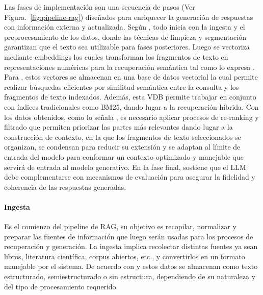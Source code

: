 Las fases de implementación son una secuencia de pasos (Ver Figura.~\ref{fig:pipeline-rag}) diseñados para enriquecer la generación de respuestas con información externa y actualizada. 
Según \textcite{tabassum2020}, todo inicia con la ingesta y el preprocesamiento de los datos, donde las técnicas de limpieza y segmentación garantizan 
que el texto sea utilizable para fases posteriores. Luego se vectoriza mediante embeddings los cuales transforman los fragmentos de texto
en representaciones numéricas para la recuperación semántica tal como lo expresa \textcite{minaee2021}. Para \textcite{hu2024ragrau}, estos vectores se almacenan en una base de datos vectorial 
la cual permite realizar búsquedas eficientes por similitud semántica entre la consulta y los fragmentos de texto indexados.
Además, esta VDB permite trabajar en conjunto con índices tradicionales como BM25, dando lugar a la recuperación híbrida.
Con los datos obtenidos, como lo señala \textcite{sarthi2024raptor}, 
es necesario aplicar procesos de re-ranking y filtrado que permiten priorizar las partes más relevantes dando lugar a la construcción de contexto, en la que los fragmentos de texto seleccionados 
se organizan, se condensan para reducir su extensión y se adaptan al límite de entrada del modelo para conformar un contexto optimizado y manejable que servirá de entrada
al modelo generativo. En la fase final, \textcite{knollmeyer2024benchmarking} sostiene que el LLM debe complementarse con mecanismos de evaluación para asegurar la 
fidelidad y coherencia de las respuestas generadas.

\paragraph{Ingesta} Es el comienzo del pipeline de RAG, su objetivo es recopilar, normalizar y preparar las fuentes de información
que luego serán usadas para los procesos de recuperación y generación. La ingesta implica recolectar distintas fuentes ya sean libros, literatura científica, corpus abiertos, etc., y convertirlos en un formato manejable por el 
sistema. De acuerdo con \textcite{gao2023rag} y \textcite{jing2024vecdb} estos datos se almacenan como texto estructurado, semiestructurado o sin estructura, dependiendo de su naturaleza y del tipo de procesamiento requerido.

